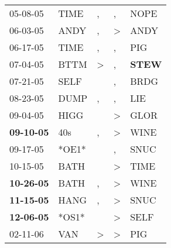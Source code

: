 \begin{supertabular}{p{0.07\textwidth}p{0.06\textwidth}p{0.02\textwidth}p{0.02\textwidth}p{0.06\textwidth}}
          05-08-05\textsuperscript{} &           TIME\textsuperscript{} &                , &                , &           NOPE\textsuperscript{} \\
          06-03-05\textsuperscript{} &           ANDY\textsuperscript{} &                , &     \textgreater &           ANDY\textsuperscript{} \\
          06-17-05\textsuperscript{} &           TIME\textsuperscript{} &                , &                , &            PIG\textsuperscript{} \\
          07-04-05\textsuperscript{} &           BTTM\textsuperscript{} &     \textgreater &                , &  \textbf{STEW\textsuperscript{}} \\
          07-21-05\textsuperscript{} &           SELF\textsuperscript{} &                  &                , &           BRDG\textsuperscript{} \\
          08-23-05\textsuperscript{} &           DUMP\textsuperscript{} &                , &                , &            LIE\textsuperscript{} \\
          09-04-05\textsuperscript{} &           HIGG\textsuperscript{} &                  &     \textgreater &           GLOR\textsuperscript{} \\
 \textbf{09-10-05\textsuperscript{}} &            40s\textsuperscript{} &                , &     \textgreater &           WINE\textsuperscript{} \\
          09-17-05\textsuperscript{} &                            *OE1* &                  &                , &           SNUC\textsuperscript{} \\
          10-15-05\textsuperscript{} &           BATH\textsuperscript{} &                  &     \textgreater &           TIME\textsuperscript{} \\
 \textbf{10-26-05\textsuperscript{}} &           BATH\textsuperscript{} &                , &     \textgreater &           WINE\textsuperscript{} \\
 \textbf{11-15-05\textsuperscript{}} &           HANG\textsuperscript{} &                , &     \textgreater &           SNUC\textsuperscript{} \\
 \textbf{12-06-05\textsuperscript{}} &                            *OS1* &                  &     \textgreater &           SELF\textsuperscript{} \\
          02-11-06\textsuperscript{} &            VAN\textsuperscript{} &     \textgreater &     \textgreater &            PIG\textsuperscript{} \\

\end{supertabular}
